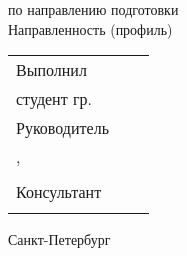 \noindent	по направлению подготовки \thesisSpecialtyCodeAndTitle{}\\%
\noindent	Направленность (профиль)	\thesisOPCodeAndTitle %
\par%





\vspace{4mm plus2fill}%

\noindent
\begin{tabularx}{\linewidth}{lXl}
	Выполнил              &	   &             \\
	студент гр.~\group     &    & \Author     \\[\mfloatsep]
	
	Руководитель 		  &    &             \\
	\SupervisorJob,		  &    &             \\
	\SupervisorDegree \SupervisorTitle &    & \Supervisor \\[\mfloatsep]
	
	Консультант	  &    & 			 \\
	\ConsultantExtraDegree 	  &    & \ConsultantExtra\\[\mfloatsep]
	
\end{tabularx} %


%
\vspace{0pt plus4fill}%


\begin{center}%
	Санкт-Петербург\\
	\thesisYear
\end{center}%
\restoregeometry
\newpage
